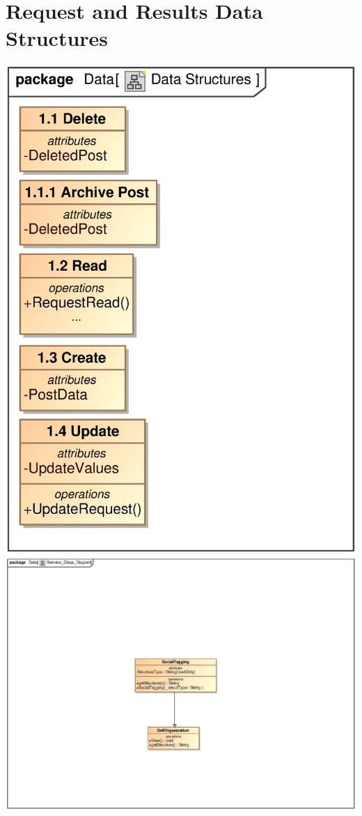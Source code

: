 \documentclass{scrreprt}
\begin{document}
\section{Request and Results Data Structures} 
\includegraphics[scale=.4]{DataStructuresCRUD.eps}
\includegraphics[scale=.4]{Semaka_Class_Diagram.eps}
\end{document}
